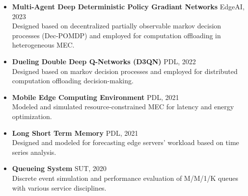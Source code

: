 \documentclass[11pt]{article}
\begin{document}
\begin{itemize}
	

		
	
	
	\item \textbf{Multi-Agent Deep Deterministic Policy Gradiant Networks} \hfill EdgeAI, 2023\\
	Designed based on decentralized partially observable markov decision processes (Dec-POMDP) and employed for computation offloading in heterogeneous MEC.
	
	
	
	\item \textbf{Dueling Double Deep Q-Networks (D3QN)} \hfill PDL, 2022\\
     Designed based on markov decision processes and employed for distributed computation offloading decision-making. \href{https://github.com/ImanRHT/QECO}{\faGithub} %
	
	
	\item \textbf{Mobile Edge Computing Environment} \hfill PDL, 2021\\
	Modeled and simulated resource-constrained MEC for latency and energy optimization. \href{https://github.com/ImanRHT/MEC_Environment}{\faGithub} %
	

	
	\item \textbf{Long Short Term Memory} \hfill PDL, 2021\\
	Designed and modeled for forecasting edge servers' workload based on time series analysis.
	
	
	\item \textbf{Queueing System} \hfill SUT, 2020\\
	Discrete event simulation and performance evaluation of M/M/1/K queues with various service disciplines. \href{https://github.com/ImanRHT/MM1K_Queue_Simulation}{\faGithub} 
	



\end{itemize}
\end{document}
